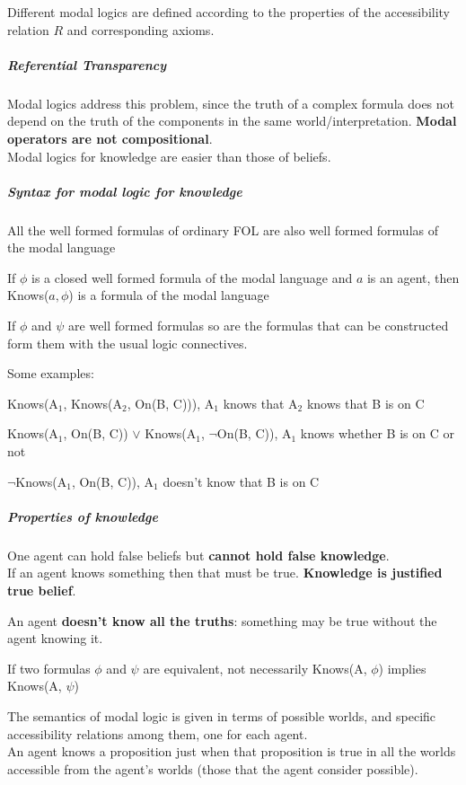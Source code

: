 \documentclass[10pt]{report}
\begin{document}
Different modal logics are defined according to the properties of the accessibility relation $R$ and corresponding axioms.
\subparagraph{Referential Transparency} Modal logics address this problem, since the truth of a complex formula does not depend on the truth of the components in the same world/interpretation. \textbf{Modal operators are not compositional}.\\
Modal logics for knowledge are easier than those of beliefs.
\subparagraph{Syntax for modal logic for knowledge} \begin{list}{}{}
	\item All the well formed formulas of ordinary FOL are also well formed formulas of the modal language
	\item If $\phi$ is a closed well formed formula of the modal language and $a$ is an agent, then Knows($a,\phi$) is a formula of the modal language
	\item If $\phi$ and $\psi$ are well formed formulas so are the formulas that can be constructed form them with the usual logic connectives.
\end{list}
Some examples:
\begin{list}{}{}
	\item Knows(A$_1$, Knows(A$_2$, On(B, C))), A$_1$ knows that A$_2$ knows that B is on C
	\item Knows(A$_1$, On(B, C)) $\vee$ Knows(A$_1$, $\neg$On(B, C)), A$_1$ knows whether B is on C or not
	\item $\neg$Knows(A$_1$, On(B, C)), A$_1$ doesn't know that B is on C
\end{list}
\subparagraph{Properties of knowledge}\begin{list}{}{}
	\item One agent can hold false beliefs but \textbf{cannot hold false knowledge}.\\
	If an agent knows something then that must be true. \textbf{Knowledge is justified true belief}.
	\item An agent \textbf{doesn't know all the truths}: something may be true without the agent knowing it.
	\item If two formulas $\phi$ and $\psi$ are equivalent, not necessarily Knows(A, $\phi$) implies Knows(A, $\psi$)
\end{list}
The semantics of modal logic is given in terms of possible worlds, and specific accessibility relations among them, one for each agent.\\
An agent knows a proposition just when that proposition is true in all the worlds accessible from the agent's worlds (those that the agent consider possible).\\
\end{document}

